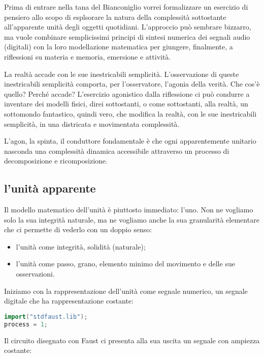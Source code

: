 \documentclass{gs-adonis}
\providecommand{\tightlist}{%
  \setlength{\itemsep}{0pt}\setlength{\parskip}{0pt}}
\begin{document}
Prima di entrare nella tana del Bianconiglio vorrei formalizzare un
esercizio di pensiero allo scopo di esplsorare la natura della
complessità sottostante all'apparente unità degli oggetti quotidiani.
L'approccio può sembrare bizzarro, ma vuole combinare semplicissimi
principi di sintesi numerica dei segnali audio (digitali) con la loro
modellazione matematica per giungere, finalmente, a riflessioni su
materia e memoria, emersione e attività.

La realtà accade con le sue inestricabili semplicità. L'osservazione di
queste inestricabili semplicità comporta, per l'osservatore, l'agonia
della verità. Che cos'è quello? Perché accade? L'esercizio agonistico
dalla riflessione ci può condurre a inventare dei modelli fisici, direi
sottostanti, o come sottostanti, alla realtà, un sottomondo fantastico,
quindi vero, che modifica la realtà, con le sue inestricabili
semplicità, in una districata e movimentata complessità.

L'agon, la spinta, il conduttore fondamentale è che ogni apparentemente
unitario nasconda una complessità dinamica accessibile attraverso un
processo di decomposizione e ricomposizione.

\subsection{l'unità apparente}\label{lunituxe0-apparente}

Il modello matematico dell'unità è piuttosto immediato: l'uno. Non ne
vogliamo solo la sua integrità naturale, ma ne vogliamo anche la sua
granularità elementare che ci permette di vederlo con un doppio senso:

\begin{itemize}
\tightlist
\item
  l'unità come integrità, solidità (naturale);
\item
  l'unità come passo, grano, elemento minimo del movimento e delle sue
  osservazioni.
\end{itemize}

Iniziamo con la rappresentazione dell'unità come segnale numerico, un
segnale digitale che ha rappresentazione costante:

\begin{lstlisting}[language={C++}]
import("stdfaust.lib");
process = 1;
\end{lstlisting}

Il circuito disegnato con Faust ci presenta alla sua uscita un segnale
con ampiezza costante:
\end{document}
